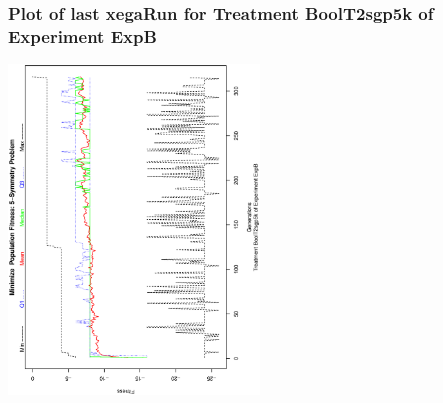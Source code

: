  \begin{frame}
 \frametitle{ Plot of last xegaRun for Treatment BoolT2sgp5k of Experiment ExpB }
 \begin{center}
\includegraphics[width=0.5\textwidth, angle=-90]
{ExpBPlotPopStatsFigure013.eps}
 \end{center}
 \label{report/ExpBPlotPopStatsFigure013.eps}  
 \end{frame}

